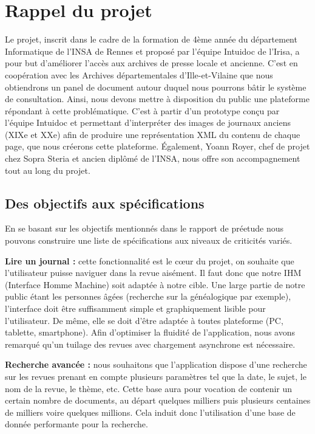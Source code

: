 \section{Rappel du projet}
\label{sec:rapp}

Le projet, inscrit dans le cadre de la formation de 4ème année du département Informatique de l’INSA de Rennes et proposé par l’équipe
Intuidoc de l’Irisa, a pour but d’améliorer l’accès aux archives de presse locale et ancienne. C’est en coopération avec les Archives
départementales d’Ille-et-Vilaine que nous obtiendrons un panel de document autour duquel nous pourrons bâtir le système de consultation.
Ainsi, nous devons mettre à disposition du public une plateforme répondant à cette problématique.
C’est à partir d’un prototype conçu par l’équipe Intuidoc et permettant d’interpréter des images de journaux anciens (XIXe et XXe) afin
de produire une représentation XML du contenu de chaque page, que nous créerons cette plateforme.
Également, Yoann Royer, chef de projet chez Sopra Steria et ancien diplômé de l’INSA, nous offre son accompagnement tout au long du projet.

    \subsection{Des objectifs aux spécifications}
    \label{sec:objectifs}
    En se basant sur les objectifs mentionnés dans le rapport de préetude nous pouvons construire une liste de spécifications aux niveaux de criticités variés.


    \textbf{Lire un journal :} cette fonctionnalité est le cœur du projet, on souhaite que l’utilisateur puisse naviguer dans la revue aisément.
    Il faut donc que notre IHM (Interface Homme Machine) soit adaptée à notre cible. Une large partie de notre public étant les personnes âgées
    (recherche sur la généalogique par exemple), l’interface doit être suffisamment simple et graphiquement lisible pour l’utilisateur. De même,
    elle se doit d’être adaptée à toutes plateforme (PC, tablette, smartphone). Afin d’optimiser la fluidité de l’application, nous avons remarqué
    qu’un tuilage des revues avec chargement asynchrone est nécessaire. %


    \textbf{Recherche avancée :} nous souhaitons que l’application dispose d’une recherche sur les revues prenant en compte plusieurs paramètres
    tel que la date, le sujet, le nom de la revue, le thème, etc. Cette base aura pour vocation de contenir un certain nombre de documents, au
    départ quelques milliers puis plusieurs centaines de milliers voire quelques millions. Cela induit donc l’utilisation d’une base de donnée
    performante pour la recherche.


